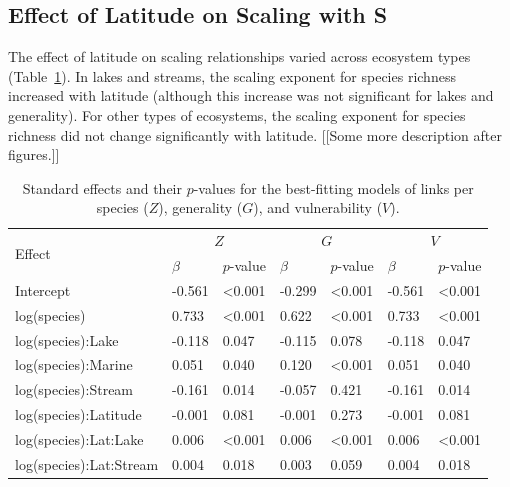 \documentclass[12pt]{article}
\begin{document}
\subsection*{Effect of Latitude on Scaling with S}

The effect of latitude on scaling relationships varied across ecosystem types (Table~\ref{Bestfits}). 
In lakes and streams, the scaling exponent for species richness increased with latitude (although this 
increase was not significant for lakes and generality). For other types of ecosystems, the scaling 
exponent for species richness did not change significantly with latitude. 
[[Some more description after figures.]]

\begin{table}[!h]

\caption{Standard effects and their $p$-values for the best-fitting models of links per species ($Z$), generality ($G$), and vulnerability ($V$).}
\label{Bestfits}
\begin{tabular}{l | l l | l l | l l }
\multirow{2}{*}{Effect} & \multicolumn{2}{c}{$Z$} & \multicolumn{2}{c}{$G$} & \multicolumn{2}{c}{$V$}\\
                & $\beta$ & $p$-value &  $\beta$ & $p$-value &  $\beta$ & $p$-value & \\
\hline
Intercept               & -0.561 & \textless0.001 & -0.299 & \textless0.001 & -0.561 & \textless0.001 \\
log(species)            &  0.733 & \textless0.001 &  0.622 & \textless0.001 &  0.733 & \textless0.001 \\
log(species):Lake       & -0.118 & 0.047          & -0.115 & 0.078          & -0.118 & 0.047 \\
log(species):Marine     &  0.051 & 0.040          &  0.120 & \textless0.001 &  0.051 & 0.040 \\
log(species):Stream     & -0.161 & 0.014          & -0.057 & 0.421          & -0.161 & 0.014 \\
log(species):Latitude   & -0.001 & 0.081          & -0.001 & 0.273          & -0.001 & 0.081 \\
log(species):Lat:Lake   &  0.006 & \textless0.001 &  0.006 & \textless0.001 &  0.006 & \textless0.001 \\
log(species):Lat:Stream &  0.004 & 0.018          &  0.003 & 0.059          &  0.004 & 0.018 \\
\hline
\end{tabular}
\end{table}
\end{document}
